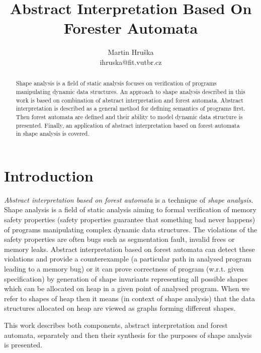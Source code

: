 \documentclass[a4paper, 12pt]{article}
\title{Abstract Interpretation Based On Forester Automata}
\author{Martin Hruška\\ihruska@fit.vutbr.cz}
\date{}
\begin{document}
\maketitle

\begin{abstract}
Shape analysis is a field of static analysis focuses on verification of
programs manipulating dynamic data structures.
An approach to shape analysis described in this work
is based on combination of abstract interpretation and forest automata.
Abstract interpretation is described as a general method
for defining semantics of programs first.
Then forest automata are defined and their ability
to model dynamic data structure is presented.
Finally, an application of abstract interpretation based on
forest automata in shape analysis is covered. 
\end{abstract}

\tableofcontents

\section{Introduction}
\label{sec:intro}

\emph{Abstract interpretation based on forest automata} is a technique of \emph{shape analysis}.
Shape analysis is a field of static analysis aiming to
formal verification of memory safety properties (safety properties
guarantee that something bad never happens) of
programs manipulating complex dynamic data structures.
The violations of the safety properties are often bugs
such as segmentation fault, invalid frees or memory leaks.
Abstract interpretation based on forest automata can detect these violations
and provide a counterexample (a particular path in analysed program
leading to a memory bug) or it can prove correctness of program (w.r.t. given specification)
by generation of shape invariants representing all possible shapes which
can be allocated on heap in a given point of analysed program.
When we refer to shapes of heap then it means (in context of shape analysis)
that the data structures allocated on heap are viewed
as graphs forming different shapes.

This work describes both components, abstract interpretation
and forest automata, separately and then their
synthesis for the purposes of shape analysis is presented.
\end{document}
